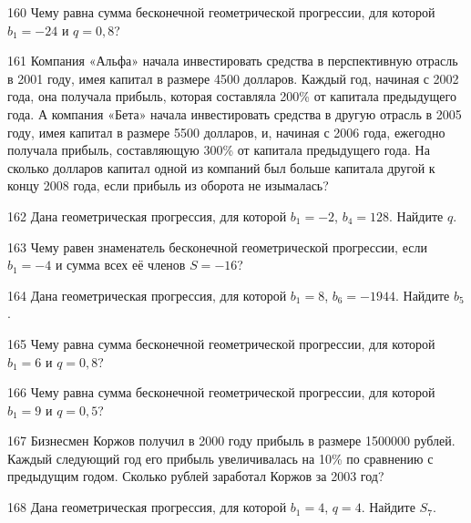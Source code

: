 \documentclass[4apaper]{article}
\begin{document}
\begin{taskBN}{160}
Чему равна сумма бесконечной геометрической прогрессии, для которой $b_1 = -24$ и $q=0,8$?
\end{taskBN}

\begin{taskBN}{161}
Компания «Альфа» начала инвестировать средства в перспективную отрасль в 2001 году, имея капитал в размере 4500 долларов. Каждый год, начиная с 2002 года, она получала прибыль, которая составляла 200\% от капитала предыдущего года. А компания «Бета» начала инвестировать средства в другую отрасль в 2005 году, имея капитал в размере 5500 долларов, и, начиная с 2006 года, ежегодно получала прибыль, составляющую 300\% от капитала предыдущего года. На сколько долларов капитал одной из компаний был больше капитала другой к концу 2008 года, если прибыль из оборота не изымалась?
\end{taskBN}

\begin{taskBN}{162}
Дана геометрическая прогрессия, для которой $b_1 = -2$, $b_{4}=128$. Найдите $q$.
\end{taskBN}

\begin{taskBN}{163}
Чему равен знаменатель бесконечной геометрической прогрессии, если $b_1 = -4$ и сумма всех её членов $S=-16$?
\end{taskBN}

\begin{taskBN}{164}
Дана геометрическая прогрессия, для которой $b_1 = 8$, $b_{6}=-1944$. Найдите $b_{5}$.
\end{taskBN}

\begin{taskBN}{165}
Чему равна сумма бесконечной геометрической прогрессии, для которой $b_1 = 6$ и $q=0,8$?
\end{taskBN}

\begin{taskBN}{166}
Чему равна сумма бесконечной геометрической прогрессии, для которой $b_1 = 9$ и $q=0,5$?
\end{taskBN}

\begin{taskBN}{167}
Бизнесмен Коржов получил в 2000 году прибыль в размере 1500000 рублей. Каждый следующий год его прибыль увеличивалась на 10\% по сравнению с предыдущим годом. Сколько рублей заработал Коржов за 2003 год?
\end{taskBN}

\begin{taskBN}{168}
Дана геометрическая прогрессия, для которой $b_1 = 4$, $q=4$. Найдите $S_{7}$.
\end{taskBN}
\end{document}
